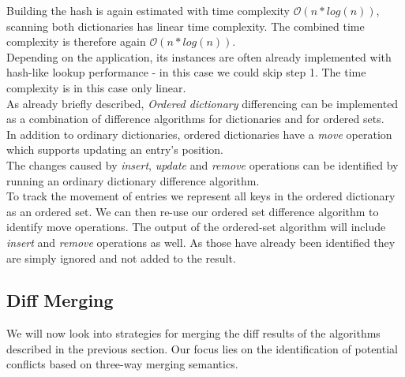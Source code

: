 Building the hash is again estimated with time complexity $ \mathcal O(n * log(n)) $, scanning both dictionaries has linear time complexity. The combined time complexity is therefore again $ \mathcal O(n * log(n)) $.\\
Depending on the application, its instances are often already implemented with hash-like lookup performance - in this case we could skip step 1.
The time complexity is in this case only linear.\\

As already briefly described, \emph{Ordered dictionary} differencing can be implemented as a combination of difference algorithms for dictionaries and for ordered sets.\\
In addition to ordinary dictionaries, ordered dictionaries have a \emph{move} operation which supports updating an entry's position.\\
The changes caused by \emph{insert}, \emph{update} and \emph{remove} operations can be identified by running an ordinary dictionary difference algorithm.\\
To track the movement of entries we represent all keys in the ordered dictionary as an ordered set.
We can then re-use our ordered set difference algorithm to identify move operations.
The output of the ordered-set algorithm will include \emph{insert} and \emph{remove} operations as well.
As those have already been identified they are simply ignored and not added to the result.\\

\subsection{Diff Merging}
\label{sec:histo.merging.merge}

We will now look into strategies for merging the diff results of the algorithms described in the previous section.
Our focus lies on the identification of potential conflicts based on three-way merging semantics.\\

